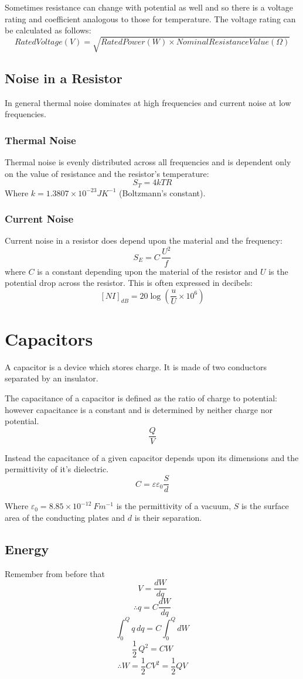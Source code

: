\documentclass[11pt,a4paper]{report}
\begin{document}
Sometimes resistance can change with potential as well and so there is a voltage rating and coefficient analogous to those for temperature. The voltage rating can be calculated as follows:
\[Rated Voltage(V)=\sqrt{Rated Power(W) \times Nominal Resistance Value(\Omega)}\]

\subsection{Noise in a Resistor}
In general thermal noise dominates at high frequencies and current noise at low frequencies.
\subsubsection{Thermal Noise}
Thermal noise is evenly distributed across all frequencies and is dependent only on the value of resistance and the resistor's temperature:
\[S_T = 4kTR\]
Where $k = 1.3807 \times 10^{-23} JK^{-1}$ (Boltzmann's constant). 

\subsubsection{Current Noise}
Current noise in a resistor does depend upon the material and the frequency:
\[S_E = C \, \frac{U^2}{f}\] where $C$ is a constant depending upon the material of the resistor and $U$ is the potential drop across the resistor.
This is often expressed in decibels:
\[[NI]_{dB} = 20 \log \left( \frac{u}{U} \times 10^6 \right)\]

\section{Capacitors}
A capacitor is a device which stores charge. It is made of two conductors separated by an insulator.

The capacitance of a capacitor is defined as the ratio of charge to potential: however capacitance is a constant and is determined by neither charge nor potential.
\[\frac{Q}{V}\]

Instead the capacitance of a given capacitor depends upon its dimensions and the permittivity of it's dielectric.
\[C=\varepsilon \varepsilon_0 \frac{S}{d}\]

Where $\varepsilon_0 = 8.85 \times10^{-12} \: Fm^{-1}$ is the permittivity of a vacuum, $S$ is the surface area of the conducting plates and $d$ is their separation.

\subsection{Energy}
Remember from before that 
\[V=\frac{dW}{dq}\]
\[\therefore q=C\frac{dW}{dq}\]
\[\int_0^Q q \, dq = C \int_0^Q dW\]
\[\frac{1}{2} \, Q^2 = CW\]
\[\therefore W=\frac{1}{2}CV^2=\frac{1}{2}QV\]
\end{document}
